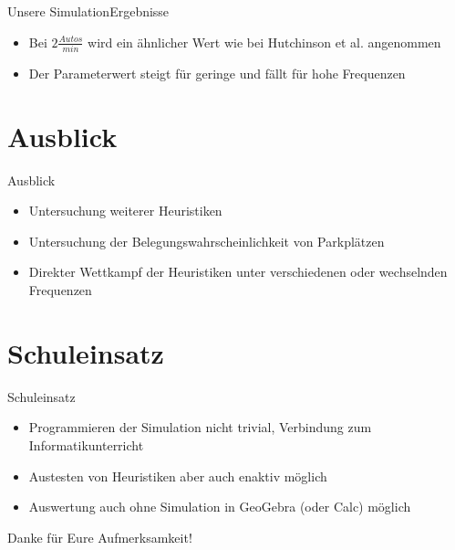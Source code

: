 \documentclass[11pt]{beamer}
\begin{document}
\begin{frame}{Unsere Simulation}{Ergebnisse}
\begin{itemize}
	\item Bei $2 \frac{Autos}{min}$ wird ein ähnlicher Wert wie bei Hutchinson et al. angenommen
	\item Der Parameterwert steigt für geringe und fällt für hohe Frequenzen
\end{itemize}
\end{frame}

\section{Ausblick}

\begin{frame}{Ausblick}
	\begin{itemize}
		\item Untersuchung weiterer Heuristiken
		\item Untersuchung der Belegungswahrscheinlichkeit von Parkplätzen
		\item Direkter Wettkampf der Heuristiken unter verschiedenen oder wechselnden Frequenzen
	\end{itemize}
\end{frame}

\section{Schuleinsatz}

\begin{frame}{Schuleinsatz}
\begin{itemize}
	\item Programmieren der Simulation nicht trivial, Verbindung zum Informatikunterricht
	\item Austesten von Heuristiken aber auch enaktiv möglich
	\item Auswertung auch ohne Simulation in GeoGebra (oder Calc) möglich 
\end{itemize}
\end{frame}

\begin{frame}
Danke für Eure Aufmerksamkeit!
\end{frame}
\end{document}
